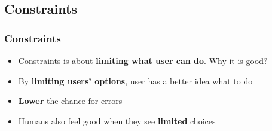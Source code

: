 \documentclass{beamer}
\begin{document}
%


\subsection{Constraints}
\begin{frame}
\frametitle{Constraints}
\begin{itemize}
	\item Constraints is about \textbf{limiting what user can do}.  Why it is good?
	\item By \textbf{limiting users' options}, user has a better idea what to do
	\item \textbf{Lower} the chance for errors
	\item Humans also feel good when they see \textbf{limited }choices
\end{itemize}
\end{frame}

\end{document}
